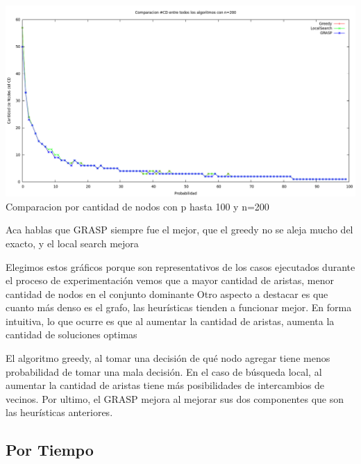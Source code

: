 \begin{center}
\includegraphics[width=17cm]{./graficos/comparacioncantCDprobvariablen200.png}\\
Comparacion por cantidad de nodos con p hasta 100 y n=200
\end{center}


Aca hablas que GRASP siempre fue el mejor, que el greedy no se aleja mucho del exacto, y el local search mejora 

Elegimos estos gráficos porque son representativos de los casos ejecutados durante el proceso de experimentación
vemos que a mayor cantidad de aristas, menor cantidad de nodos en el conjunto dominante
Otro aspecto a destacar es que cuanto más denso es el grafo, las heurísticas tienden a funcionar mejor.
En forma intuitiva, lo que ocurre es que al aumentar la cantidad de
aristas, aumenta la cantidad de soluciones optimas

El algoritmo greedy, al tomar una decisión de qué nodo agregar tiene menos probabilidad de tomar una mala decisión. 
En el caso de búsqueda local, al aumentar la cantidad de aristas tiene más posibilidades de intercambios de vecinos. Por ultimo, el
GRASP mejora al mejorar sus dos componentes que son las heurísticas anteriores.




\subsection{Por Tiempo}


